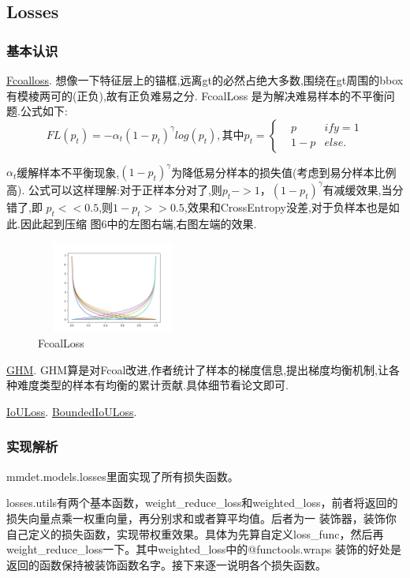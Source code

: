 \documentclass[UTF8]{ctexart}
\begin{document}
\subsection{Losses}
\label{sec:loss}
\subsubsection{基本认识}

\href{https://arxiv.org/abs/1708.02002}{Fcoalloss}.
想像一下特征层上的锚框,远离gt的必然占绝大多数,围绕在gt周围的bbox有模棱两可的(正负),故有正负难易之分.
FcoalLoss 是为解决难易样本的不平衡问题.公式如下:
\begin{equation}
	FL(p_t) = -\alpha_{t}(1-p_t)^{\gamma}log(p_t),\text{其中}
	p_t=\left\{
	\begin{aligned}
	&p & if y =1\\
	&1-p & else.
	\end{aligned}
	\right.
\end{equation}

$\alpha_t$缓解样本不平衡现象,$(1-p_t)^{\gamma}$为降低易分样本的损失值(考虑到易分样本比例高).
公式可以这样理解:对于正样本分对了,则$p_t->1$，$(1-p_t)^{\gamma}$有减缓效果,当分错了,即
$p_t << 0.5$,则$1-p_t >>0.5$,效果和CrossEntropy没差,对于负样本也是如此.因此起到压缩
图6中的左图右端,右图左端的效果.

\begin{figure}[htbp]
	\centering
	\includegraphics[width=5cm,height=3cm]{./pic/Focal_01.png}
	\caption{FcoalLoss}
\end{figure}

\href{https://arxiv.org/abs/1811.05181}{GHM}.
GHM算是对Fcoal改进,作者统计了样本的梯度信息,提出梯度均衡机制,让各种难度类型的样本有均衡的累计贡献.具体细节看论文即可.

\href{https://arxiv.org/abs/1908.03851}{IoULoss}.
\href{https://arxiv.org/abs/1711.00164}{BoundedIoULoss}.

\subsubsection{实现解析}
mmdet.models.losses里面实现了所有损失函数。

losses.utils有两个基本函数，weight\_reduce\_loss和weighted\_loss，前者将返回的损失向量点乘一权重向量，再分别求和或者算平均值。后者为一
装饰器，装饰你自己定义的损失函数，实现带权重效果。具体为先算自定义loss\_func，然后再weight\_reduce\_loss一下。其中weighted\_loss中的@functools.wraps
装饰的好处是返回的函数保持被装饰函数名字。接下来逐一说明各个损失函数。
\end{document}
